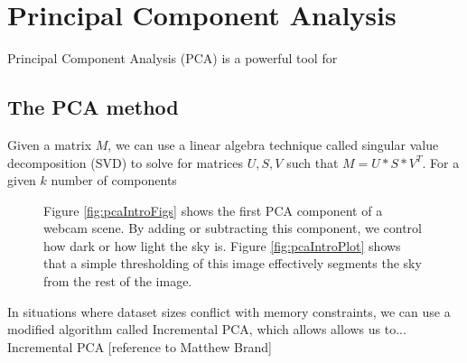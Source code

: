 %
\chapter{Principal Component Analysis}
\label{cpt:pca}

Principal Component Analysis (PCA) is a powerful tool for 

\section{The PCA method}

Given a matrix $M$, we can use a linear algebra technique called singular value decomposition (SVD) to solve for matrices $U, S, V$ such that $M = U * S * V^T.$  For a given $k$ number of components


\begin{figure}[ht]
	\centering
		\caption[Learning a sky mask for a webcam scene.]{Figure \ref{fig:pcaIntroFigs} shows the first PCA component of a webcam scene.  By adding or subtracting this component, we control how dark or how light the sky is. Figure \ref{fig:pcaIntroPlot} shows that a simple thresholding of this image effectively segments the sky from the rest of the image.}
\end{figure}

In situations where dataset sizes conflict with memory constraints, we can use a modified algorithm called Incremental PCA, which allows allows us to...  Incremental PCA [reference to Matthew Brand]